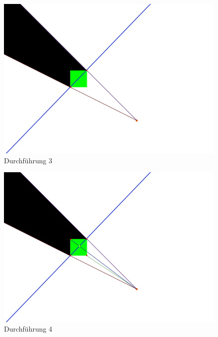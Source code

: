 \documentclass[10pt,twocolumn]{scrartcl}
\begin{document}
\begin{figure}[H]
	\centering
	\includegraphics[width=\columnwidth]{images/durchfuehrung_2.png}
	\caption{Durchführung 3}
	\label{durch3}
\end{figure}

\begin{figure}[H]
	\centering
	\includegraphics[width=\columnwidth]{images/durchfuehrung_3.png}
	\caption{Durchführung 4}
	\label{durch4}
\end{figure}
\end{document}
